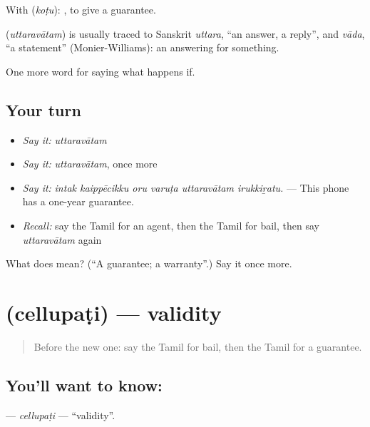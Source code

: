 With  (\emph{koṭu}):  , to give a guarantee.

\begin{cousinweb}
\textbf{} (\emph{uttaravātam}) is usually traced to Sanskrit \emph{uttara}, \textquotedblleft{}an answer, a reply\textquotedblright{}, and \emph{vāda}, \textquotedblleft{}a statement\textquotedblright{} (Monier-Williams): an answering for something.
\end{cousinweb}

\begin{grammarlens}[title={What you've built}]
One more word for saying what happens if.
\end{grammarlens}

\subsection*{Your turn}
\begin{itemize}
\raggedright
  \item \emph{Say it:} \emph{uttaravātam}
  \item \emph{Say it:} \emph{uttaravātam}, once more
  \item \emph{Say it:} \emph{intak kaippēcikku oru varuṭa uttaravātam irukkiṟatu.} — This phone has a one-year guarantee.
  \item \emph{Recall:} say the Tamil for an agent, then the Tamil for bail, then say \emph{uttaravātam} again
\end{itemize}

\begin{tcolorbox}[breakable,colback=teal!4,colframe=teal!35!black,title={Before you move on}]
What does  mean? (\textquotedblleft{}A guarantee; a warranty\textquotedblright{}.) Say it once more.
\end{tcolorbox}
\section[\texorpdfstring{\ta{செல்லுபடி} (cellupaṭi)}{செல்லுபடி (cellupaṭi)}]{ (cellupaṭi) — validity}

\label{lesson:TA-C542-cellupati}



\begin{quote}
Before the new one: say the Tamil for bail, then the Tamil for a guarantee.
\end{quote}

\subsection*{You'll want to know: }
\textbf{} — \emph{cellupaṭi} — \textquotedblleft{}validity\textquotedblright{}.

